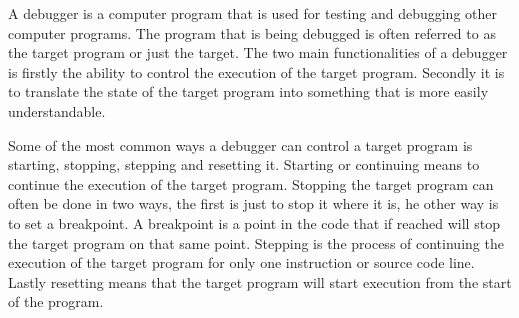  


A debugger is a computer program that is used for testing and debugging other computer programs.
The program that is being debugged is often referred to as the target program or just the target.
The two main functionalities of a debugger is firstly the ability to control the execution of the target program.
Secondly it is to translate the state of the target program into something that is more easily understandable.


Some of the most common ways a debugger can control a target program is starting, stopping, stepping and resetting it.
Starting or continuing means to continue the execution of the target program.
Stopping the target program can often be done in two ways, the first is just to stop it where it is, he other way is to set a breakpoint.
A breakpoint is a point in the code that if reached will stop the target program on that same point.
Stepping is the process of continuing the execution of the target program for only one instruction or source code line.
Lastly resetting means that the target program will start execution from the start of the program.


